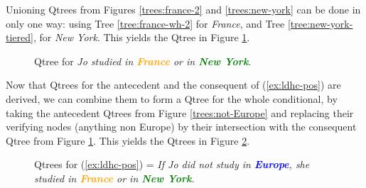 Unioning Qtrees from Figures \ref{trees:france-2} and \ref{trees:new-york} can be done in only one way: using Tree \ref{tree:france-wh-2} for \textit{France}, and Tree \ref{tree:new-york-tiered}, for \textit{New York}. This yields the Qtree in Figure \ref{tree:france-or-new-york}.

\begin{figure}[H]
	\centering
	\caption{Qtree for \textit{Jo studied in \textcolor{orange}{\textbf{France}} or in \textcolor{green}{\textbf{New York}}}.}\label{tree:france-or-new-york}
\end{figure}

Now that Qtrees for the antecedent and the consequent of (\ref{ex:ldhc-pos}) are derived, we can combine them to form a Qtree for the whole conditional, by taking the antecedent Qtrees from Figure \ref{trees:not-Europe} and replacing their verifying nodes (anything non Europe) by their intersection with the consequent Qtree from Figure \ref{tree:france-or-new-york}. This yields the Qtrees in Figure \ref{trees:if-not-Europe-then-france-or-new-york}. 

\begin{figure}[H]
	\centering
	\begin{subfigure}[b]{.45\linewidth}
		\centering
		\caption{}
	\end{subfigure}
	\hfill
	\begin{subfigure}[b]{.45\linewidth}
		\centering
		\caption{}
	\end{subfigure}
	\caption{Qtrees for (\ref{ex:ldhc-pos}) = \textit{If Jo did not study in \textcolor{blue}{\textbf{Europe}}, she studied in \textcolor{orange}{\textbf{France}} or in \textcolor{green}{\textbf{New York}}.}}\label{trees:if-not-Europe-then-france-or-new-york}
\end{figure}

